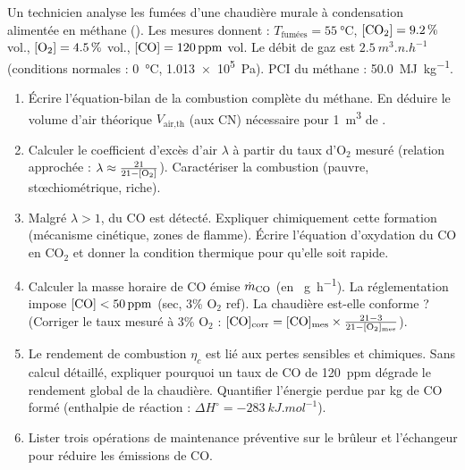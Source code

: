\documentclass[11pt]{article}
\begin{document}
\begin{exercice}
Un technicien analyse les fumées d'une chaudière murale à condensation alimentée en méthane (). Les mesures donnent : $T_{\text{fumées}} = \SI{55}{\celsius}$, $[\ce{CO2}] = \SI{9,2}{\%}$ vol., $[\ce{O2}] = \SI{4,5}{\%}$ vol., $[\ce{CO}] = \SI{120}{ppm}$ vol. Le débit de gaz est $\SI{2,5}{m^3.n.h^{-1}}$ (conditions normales : \SI{0}{\celsius}, \SI{1,013e5}{Pa}). PCI du méthane : \SI{50,0}{MJ.kg^{-1}}.
\begin{enumerate}
    \item Écrire l'équation-bilan de la combustion complète du méthane. En déduire le volume d'air théorique $V_{\text{air,th}}$ (aux CN) nécessaire pour \SI{1}{m^3} de .
    \item Calculer le coefficient d'excès d'air $\lambda$ à partir du taux d'O$_2$ mesuré (relation approchée : $\lambda \approx \frac{21}{21 - [\ce{O2}]}$). Caractériser la combustion (pauvre, stœchiométrique, riche).
    \item Malgré $\lambda > 1$, du CO est détecté. Expliquer chimiquement cette formation (mécanisme cinétique, zones de flamme). Écrire l'équation d'oxydation du CO en CO$_2$ et donner la condition thermique pour qu'elle soit rapide.
    \item Calculer la masse horaire de CO émise $\dot{m}_{\ce{CO}}$ (en \SI{}{g.h^{-1}}). La réglementation impose $[\ce{CO}] < \SI{50}{ppm}$ (sec, 3\% O$_2$ ref). La chaudière est-elle conforme ? (Corriger le taux mesuré à 3\% O$_2$ : $[\ce{CO}]_{\text{corr}} = [\ce{CO}]_{\text{mes}} \times \frac{21-3}{21-[\ce{O2}]_{\text{mes}}}$).
    \item Le rendement de combustion $\eta_c$ est lié aux pertes sensibles et chimiques. Sans calcul détaillé, expliquer pourquoi un taux de CO de \SI{120}{ppm} dégrade le rendement global de la chaudière. Quantifier l'énergie perdue par kg de CO formé (enthalpie de réaction  : $\Delta H^\circ = \SI{-283}{kJ.mol^{-1}}$).
    \item Lister trois opérations de maintenance préventive sur le brûleur et l'échangeur pour réduire les émissions de CO.
\end{enumerate}
\end{exercice}
\end{document}
